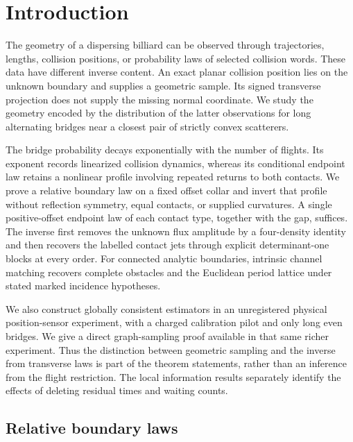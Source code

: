 \section{Introduction}
\label{sec:v26-introduction}
\label{sec:v25-introduction}

The geometry of a dispersing billiard can be observed through trajectories,
lengths, collision positions, or probability laws of selected collision
words.  These data have different inverse content.  An exact planar
collision position lies on the unknown boundary and supplies a geometric
sample.  Its signed transverse projection does not supply the missing
normal coordinate.  We study the geometry encoded by the distribution of
the latter observations for long alternating bridges near a closest pair
of strictly convex scatterers.

The bridge probability decays exponentially with the number of flights.
Its exponent records linearized collision dynamics, whereas its conditional
endpoint law retains a nonlinear profile involving repeated returns to both
contacts.  We prove a relative boundary law on a fixed offset collar and
invert that profile without reflection symmetry, equal contacts, or supplied
curvatures.  A single positive-offset endpoint law of each contact type,
together with the gap, suffices.  The inverse first removes the unknown
flux amplitude by a four-density identity and then recovers the labelled
contact jets through explicit determinant-one blocks at every order.
For connected analytic boundaries, intrinsic channel matching recovers
complete obstacles and the Euclidean period lattice under stated marked
incidence hypotheses.

We also construct globally consistent estimators in an unregistered
physical position-sensor experiment, with a charged calibration pilot and
only long even bridges.  We give a direct graph-sampling proof available
in that same richer experiment.  Thus the distinction between geometric
sampling and the inverse from transverse laws is part of the theorem
statements, rather than an inference from the flight restriction.  The
local information results separately identify the effects of deleting
residual times and waiting counts.

\subsection{Relative boundary laws}

